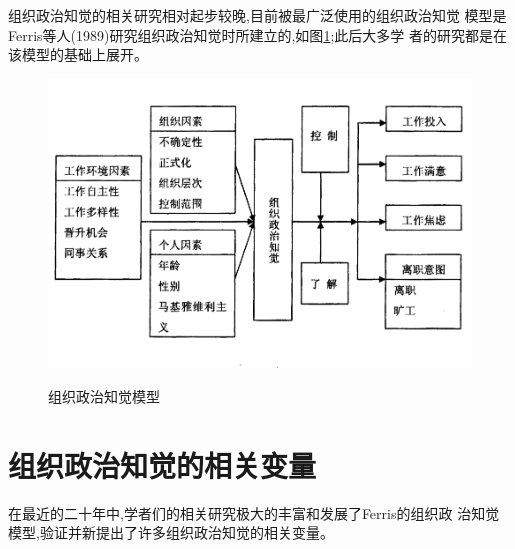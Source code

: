 \documentclass[10pt,a4paper]{article}
\begin{document}
\begin{CJK*}{UTF8}{gkai}
组织政治知觉的相关研究相对起步较晚,目前被最广泛使用的组织政治知觉
模型是Ferris等人(1989)研究组织政治知觉时所建立的,如图\ref{fig:1};此后大多学
者的研究都是在该模型的基础上展开\cite{6}。
\begin{figure}[!htbp]
	\centering
	\caption{组织政治知觉模型}  
		\includegraphics[scale=0.45]{figs/1.png}
    	\label{fig:1}
\end{figure}



\section{组织政治知觉的相关变量}
在最近的二十年中,学者们的相关研究极大的丰富和发展了Ferris的组织政
治知觉模型,验证并新提出了许多组织政治知觉的相关变量。

\end{CJK*}
\end{document}
